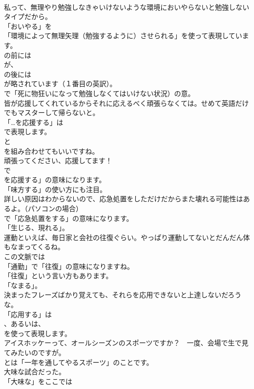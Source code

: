 \documentclass[8pt]{extreport}
\begin{document}
\begin{CJK}{UTF8}{min}
\\	私って、無理やり勉強しなきゃいけないような環境においやらないと勉強しないタイプだから。 
\\	「おいやる」を
\\	「環境によって無理矢理（勉強するように）させられる」を使って表現しています。
\\	の前には
\\	が、
\\	の後には
\\	が略されています（１番目の英訳）。
\\	で「死に物狂いになって勉強しなくてはいけない状況）の意。	
\\	皆が応援してくれているからそれに応えるべく頑張らなくては。せめて英語だけでもマスターして帰らないと。 
\\	「…を応援する」は 
\\	で表現します。
\\	と 
\\	を組み合わせてもいいですね。	
\\	頑張ってください、応援してます！ 
\\	で
\\	を応援する」の意味になります。
\\	「味方する」の使い方にも注目。	
\\	詳しい原因はわからないので、応急処置をしただけだからまた壊れる可能性はあるよ。（パソコンの場合） 
\\	で「応急処置をする」の意味になります。
\\	「生じる、現れる」。	
\\	運動といえば、毎日家と会社の往復ぐらい。やっぱり運動してないとだんだん体もなまってくるね。 
\\	この文脈では
\\	「通勤」で「往復」の意味になりますね。
\\	「往復」という言い方もあります。
\\	「なまる」。	
\\	決まったフレーズばかり覚えても、それらを応用できないと上達しないだろうな。 
\\	「応用する」は
\\	、あるいは、
\\	を使って表現します。	
\\	アイスホッケーって、オールシーズンのスポーツですか？　一度、会場で生で見てみたいのですが。 
\\	とは「一年を通してやるスポーツ」のことです。	
\\	大味な試合だった。 
\\	「大味な」をここでは

\end{CJK}
\end{document}
